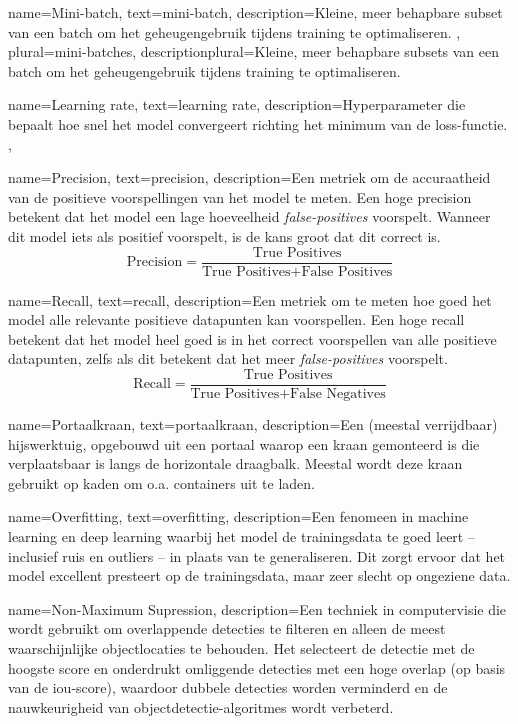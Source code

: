 {
    name={Mini-batch},
    text={mini-batch},
    description={Kleine, meer behapbare subset van een batch om het geheugengebruik tijdens training te optimaliseren. \autocite{Geron_2023}},
    plural={mini-batches},
    descriptionplural={Kleine, meer behapbare subsets van een batch om het geheugengebruik tijdens training te optimaliseren. \autocite{Geron_2023}}    
}

{
    name={Learning rate},
    text={learning rate},
    description={Hyperparameter die bepaalt hoe snel het model convergeert richting het minimum van de loss-functie. \autocite{Geron_2023}},
}

{
    name={Precision},
    text={precision},
    description={Een metriek om de accuraatheid van de positieve voorspellingen van het model te meten. Een hoge precision betekent dat het model een lage hoeveelheid \emph{false-positives} voorspelt. Wanneer dit model iets als positief voorspelt, is de kans groot dat dit correct is. 
        $$
        \text{Precision} = \frac{\text{True Positives}}{\text{True Positives} + \text{False Positives}}
        $$
        \autocite{Geron_2023}}
}

{
    name={Recall},
    text={recall},
    description={Een metriek om te meten hoe goed het model alle relevante positieve datapunten kan voorspellen. Een hoge recall betekent dat het model heel goed is in het correct voorspellen van alle positieve datapunten, zelfs als dit betekent dat het meer \emph{false-positives} voorspelt.
        $$
        \text{Recall} = \frac{\text{True Positives}}{\text{True Positives} + \text{False Negatives}}
        $$
        \autocite{Geron_2023}}
}

{
    name={Portaalkraan},
    text={portaalkraan},
    description={Een (meestal verrijdbaar) hijswerktuig, opgebouwd uit een portaal waarop een kraan gemonteerd is die verplaatsbaar is langs de horizontale draagbalk. Meestal wordt deze kraan gebruikt op kaden om o.a. containers uit te laden.}
}

{
    name={Overfitting},
    text={overfitting},
    description={Een fenomeen in machine learning en deep learning waarbij het model de trainingsdata te goed leert -- inclusief ruis en outliers -- in plaats van te generaliseren. Dit zorgt ervoor dat het model excellent presteert op de trainingsdata, maar zeer slecht op ongeziene data.}
}

{
    name={Non-Maximum Supression},
    description={Een techniek in computervisie die wordt gebruikt om overlappende detecties te filteren en alleen de meest waarschijnlijke objectlocaties te behouden. Het selecteert de detectie met de hoogste score en onderdrukt omliggende detecties met een hoge overlap (op basis van de \gls{iou}-score), waardoor dubbele detecties worden verminderd en de nauwkeurigheid van objectdetectie-algoritmes wordt verbeterd. \autocite{Geron_2023}}
}